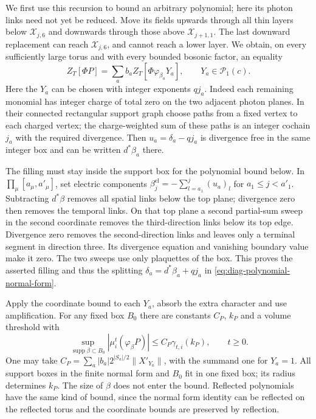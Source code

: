 \documentclass[11pt,letterpaper,reqno]{amsart}
\DeclareMathOperator{\supp}{supp}
\begin{document}
We first use this recursion to bound an arbitrary polynomial;
here its photon links need not yet be reduced. Move its fields
upwards through all thin layers below $\mathcal X_{j,6}$ and
downwards through those above $\mathcal X_{j+1,1}$. The last
downward replacement can reach $\mathcal X_{j,6}$, and cannot
reach a lower layer. We obtain, on every sufficiently large
torus and with every bounded bosonic factor, an equality
\begin{equation}\label{eq:diag-polynomial-normal-form}
 Z_T[\Phi P]=\sum_a b_a Z_T[\Phi\varphi_{\beta_a}Y_a],
 \qquad Y_a\in\mathcal P_1(c).
\end{equation}
Here the $Y_a$ can be chosen with integer exponents $qj_a$.
Indeed each remaining monomial has integer charge of total
zero on the two adjacent photon planes. In their connected
rectangular support graph choose paths from a fixed vertex
to each charged vertex; the charge-weighted sum of these
paths is an integer cochain $j_a$ with the required divergence.
Then $u_a=\delta_a-qj_a$ is divergence free in the same
integer box and can be written $d^*\beta_a$ there.

The filling must stay inside the support box for the polynomial
bound below. In
$\prod_\mu[a_\mu,a'_\mu]$, set electric components
$\beta_j^{\mathrm{el}}=-\sum_{l=a_1}^j(u_a)_l$ for
$a_1\le j<a'_1$. Subtracting $d^*\beta$ removes all spatial
links below the top plane; divergence zero then removes
the temporal links. On that top plane a second partial-sum
sweep in the second coordinate removes the third-direction
links below its top edge. Divergence zero removes the
second-direction links and leaves only a terminal segment
in direction three. Its divergence equation and vanishing
boundary value make it zero. The two sweeps use only
plaquettes of the box. This proves the asserted filling
and thus the splitting $\delta_a=d^*\beta_a+qj_a$ in
\eqref{eq:diag-polynomial-normal-form}.

Apply the coordinate bound to each $Y_a$, absorb the extra
character and use amplification. For any fixed box $B_0$
there are constants $C_P$, $k_P$ and a volume threshold with
\begin{equation}\label{eq:diag-polynomial-apriori}
 \sup_{\supp\beta\subset B_0}
       |\mu_i^t(\varphi_\beta P)|
             \le C_P\gamma_{t,i}(k_P),\qquad t\ge0.
\end{equation}
One may take
$C_P=\sum_a|b_a|2^{|S_a|/2}\|X'_{Y_a}\|$, with the summand
one for $Y_a=1$. All support boxes in the finite normal form
and $B_0$ fit in one fixed box; its radius determines $k_P$.
The size of $\beta$ does not enter the bound. Reflected
polynomials have the same kind of bound, since the normal
form identity can be reflected on the reflected torus and
the coordinate bounds are preserved by reflection.
\end{document}
